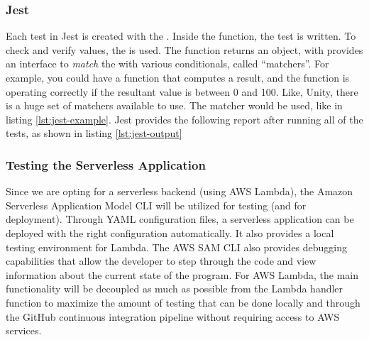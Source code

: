 \subsubsection{Jest}
Each test in Jest is created with the . Inside the 
function, the test is written. To check and verify values, the  is used. The
 function returns an  object, with provides an interface to
\emph{match} the  with various conditionals, called ``matchers''. For example, you could
have a function that computes a result, and the function is operating correctly if the resultant
value is between 0 and 100. Like, Unity, there is a huge set of matchers available to use. The
 matcher would be used, like in listing \ref{lst:jest-example}. Jest provides
the following report after running all of the tests, as shown in listing \ref{lst:jest-output}


\subsubsection{Testing the Serverless Application}
Since we are opting for a serverless backend (using AWS Lambda), the Amazon Serverless Application
Model CLI will be utilized for testing (and for deployment). Through YAML configuration files,
a serverless application can be deployed with the right configuration automatically. It also
provides a local testing environment for Lambda. The AWS SAM CLI also provides debugging
capabilities that allow the developer to step through the code and view information about the
current state of the program. For AWS Lambda, the main functionality will be decoupled as much as
possible from the Lambda handler function to maximize the amount of testing that can be done locally
and through the GitHub continuous integration pipeline without requiring access to AWS services.

